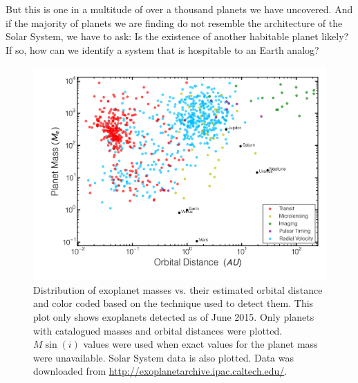     But this is one in a multitude of over a thousand planets we have uncovered. And if the majority of planets we are finding do not resemble the architecture of the Solar System, we have to ask: Is the existence of another habitable planet likely? If so, how can we identify a system that is hospitable to an Earth analog?
    \begin{figure}
    \centering
    \includegraphics[width=\textwidth]{Ch1/exoplanet_detections_june2015} 
    \caption[Exoplanet Statistics]{Distribution of exoplanet masses vs. their estimated orbital distance and color coded based on the technique used to detect them. This plot only shows exoplanets detected as of June 2015.  Only planets with catalogued masses and orbital distances were plotted. $M \sin(i)$ values were used when exact values for the planet mass were unavailable. Solar System data is also plotted. Data was downloaded from \url{http://exoplanetarchive.ipac.caltech.edu/}.}
    \label{fig:known_exoplanets}
    \end{figure}
    
